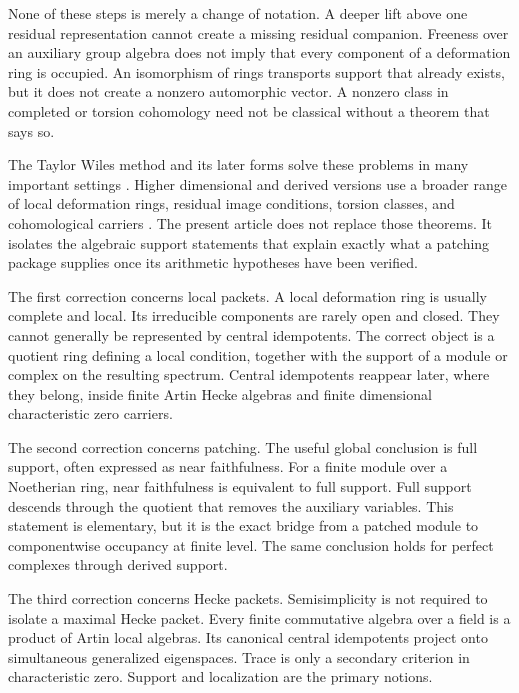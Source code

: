 \documentclass{aomart}
\theoremstyle{definition}
\theoremstyle{remark}
\begin{document}
None of these steps is merely a change of notation. A deeper lift above one residual representation cannot create a missing residual companion. Freeness over an auxiliary group algebra does not imply that every component of a deformation ring is occupied. An isomorphism of rings transports support that already exists, but it does not create a nonzero automorphic vector. A nonzero class in completed or torsion cohomology need not be classical without a theorem that says so.

The Taylor Wiles method and its later forms solve these problems in many important settings \cite{Wiles1995,TaylorWiles1995,Diamond1997,Kisin2009,Gee2022}. Higher dimensional and derived versions use a broader range of local deformation rings, residual image conditions, torsion classes, and cohomological carriers \cite{ClozelHarrisTaylor2008,BarnetLambGeeGeraghtyTaylor2014,CalegariGeraghty2018,Thorne2012,MiagkovThorne2023,Scholze2015,CaraianiScholze2017,NewtonThorne2016}. The present article does not replace those theorems. It isolates the algebraic support statements that explain exactly what a patching package supplies once its arithmetic hypotheses have been verified.

The first correction concerns local packets. A local deformation ring is usually complete and local. Its irreducible components are rarely open and closed. They cannot generally be represented by central idempotents. The correct object is a quotient ring defining a local condition, together with the support of a module or complex on the resulting spectrum. Central idempotents reappear later, where they belong, inside finite Artin Hecke algebras and finite dimensional characteristic zero carriers.

The second correction concerns patching. The useful global conclusion is full support, often expressed as near faithfulness. For a finite module over a Noetherian ring, near faithfulness is equivalent to full support. Full support descends through the quotient that removes the auxiliary variables. This statement is elementary, but it is the exact bridge from a patched module to componentwise occupancy at finite level. The same conclusion holds for perfect complexes through derived support.

The third correction concerns Hecke packets. Semisimplicity is not required to isolate a maximal Hecke packet. Every finite commutative algebra over a field is a product of Artin local algebras. Its canonical central idempotents project onto simultaneous generalized eigenspaces. Trace is only a secondary criterion in characteristic zero. Support and localization are the primary notions.
\end{document}
